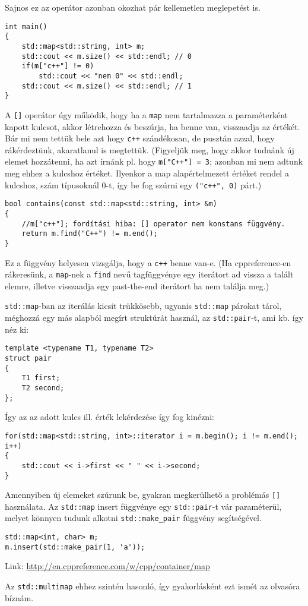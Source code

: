 \documentclass[../cpp_book/cpp_book.tex]{subfiles}
\begin{document}
	\medskip
	Sajnos ez az operátor azonban okozhat pár kellemetlen meglepetést is.
	\begin{lstlisting}
int main()
{
	std::map<std::string, int> m;
	std::cout << m.size() << std::endl; // 0
	if(m["c++"] != 0)
		std::cout << "nem 0" << std::endl;
	std::cout << m.size() << std::endl; // 1
}
	\end{lstlisting}
	A \texttt{[]} operátor úgy működik, hogy ha a \texttt{map} nem tartalmazza a paraméterként kapott kulcsot, akkor létrehozza és beszúrja, ha benne van, visszaadja az értékét. Bár mi nem tettük bele azt hogy \texttt{c++} szándékosan, de pusztán azzal, hogy rákérdeztünk, akaratlanul is megtettük. (Figyeljük meg, hogy akkor tudnánk új elemet hozzátenni, ha azt írnánk pl. hogy \texttt{m["C++"] = 3}; azonban mi nem adtunk meg ehhez a kulcshoz értéket. Ilyenkor a map alapértelmezett értéket rendel a kulcshoz, szám típusoknál 0-t, így be fog szúrni egy \texttt{("c++", 0)} párt.)
	\begin{lstlisting}
bool contains(const std::map<std::string, int> &m)
{
	//m["c++"]; fordítási hiba: [] operator nem konstans függvény.
	return m.find("C++") != m.end();
}
	\end{lstlisting}
	Ez a függvény helyesen vizsgálja, hogy a \texttt{c++} benne van-e. (Ha cppreference-en rákeresünk, a \texttt{map}-nek a \texttt{find} nevű tagfüggvénye egy iterátort ad vissza a talált elemre, illetve visszaadja egy past-the-end iterátort ha nem találja meg.)
	\medskip
	
	
	\texttt{std::map}-ban az iterálás kicsit trükkösebb, ugyanis \texttt{std::map} párokat tárol, méghozzá egy más alapból megírt struktúrát használ, az \texttt{std::pair}-t, ami kb. így néz ki:
	\begin{lstlisting}
template <typename T1, typename T2>
struct pair
{
	T1 first;
	T2 second;
};
	\end{lstlisting}
	Így az az adott kulcs ill. érték lekérdezése így fog kinézni:
	\begin{lstlisting}
for(std::map<std::string, int>::iterator i = m.begin(); i != m.end(); i++)
{
	std::cout << i->first << " " << i->second;
}
	\end{lstlisting}
	Amennyiben új elemeket szúrunk be, gyakran megkerülhető a problémás \texttt{[]} használata. Az \texttt{std::map} insert függvénye egy \texttt{std::pair}-t vár paraméterül, melyet könnyen tudunk alkotni \texttt{std::make\_pair} függvény segítségével.
	\begin{lstlisting}
std::map<int, char> m;
m.insert(std::make_pair(1, 'a'));
	\end{lstlisting}
	
	Link: \url{http://en.cppreference.com/w/cpp/container/map}
	\begin{note}
		Az \texttt{std::multimap} ehhez szintén hasonló, így gyakorlásként ezt ismét az olvasóra bíznám.
	\end{note}
\end{document}
